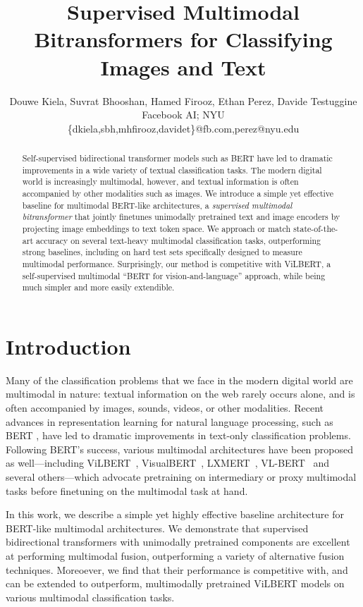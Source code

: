 \documentclass[11pt,a4paper]{article}
\title{Supervised Multimodal Bitransformers for Classifying Images and Text}
\author{Douwe Kiela, Suvrat Bhooshan, Hamed Firooz, Ethan Perez, Davide Testuggine\\
Facebook AI; NYU\\
\{dkiela,sbh,mhfirooz,davidet\}@fb.com,perez@nyu.edu
}
\date{}
\begin{document}
\maketitle
\begin{abstract}
Self-supervised bidirectional transformer models such as BERT have led to dramatic improvements in a wide variety of textual classification tasks. The modern digital world is increasingly multimodal, however, and textual information is often accompanied by other modalities such as images. We introduce a simple yet effective baseline for multimodal BERT-like architectures, a \emph{supervised multimodal bitransformer} that jointly finetunes unimodally pretrained text and image encoders by projecting image embeddings to text token space. We approach or match state-of-the-art accuracy on several text-heavy multimodal classification tasks, outperforming strong baselines, including on hard test sets specifically designed to measure multimodal performance. Surprisingly, our method is competitive with ViLBERT, a self-supervised multimodal ``BERT for vision-and-language'' approach, while being much simpler and more easily extendible.
\end{abstract}

\section{Introduction}

Many of the classification problems that we face in the modern digital world are multimodal in nature: textual information on the web rarely occurs alone, and is often accompanied by images, sounds, videos, or other modalities. Recent advances in representation learning for natural language processing, such as BERT \cite{Devlin:2019naacl}, have led to dramatic improvements in text-only classification problems. Following BERT's success, various multimodal architectures have been proposed as well---including ViLBERT~\cite{Lu:2019vilbert}, VisualBERT~\cite{Li:2019visualbert}, LXMERT~\cite{Tan:2019lxmert}, VL-BERT~\cite{Su:2019vlbert} and several others---which advocate pretraining on intermediary or proxy multimodal tasks before finetuning on the multimodal task at hand.

In this work, we describe a simple yet highly effective baseline architecture for BERT-like multimodal architectures. We demonstrate that supervised bidirectional transformers with unimodally pretrained components are excellent at performing multimodal fusion, outperforming a variety of alternative fusion techniques. Moreoever, we find that their performance is competitive with, and can be extended to outperform, multimodally pretrained ViLBERT models on various multimodal classification tasks.
\end{document}
